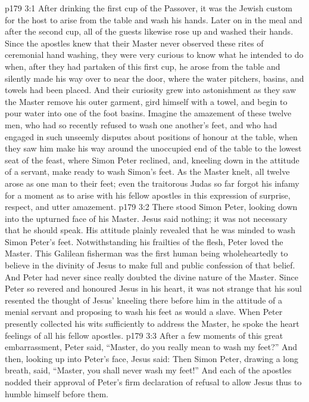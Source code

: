 \vs p179 3:1 After drinking the first cup of the Passover, it was the Jewish custom for the host to arise from the table and wash his hands. Later on in the meal and after the second cup, all of the guests likewise rose up and washed their hands. Since the apostles knew that their Master never observed these rites of ceremonial hand washing, they were very curious to know what he intended to do when, after they had partaken of this first cup, he arose from the table and silently made his way over to near the door, where the water pitchers, basins, and towels had been placed. And their curiosity grew into astonishment as they saw the Master remove his outer garment, gird himself with a towel, and begin to pour water into one of the foot basins. Imagine the amazement of these twelve men, who had so recently refused to wash one another’s feet, and who had engaged in such unseemly disputes about positions of honour at the table, when they saw him make his way around the unoccupied end of the table to the lowest seat of the feast, where Simon Peter reclined, and, kneeling down in the attitude of a servant, make ready to wash Simon’s feet. As the Master knelt, all twelve arose as one man to their feet; even the traitorous Judas so far forgot his infamy for a moment as to arise with his fellow apostles in this expression of surprise, respect, and utter amazement.
\vs p179 3:2 There stood Simon Peter, looking down into the upturned face of his Master. Jesus said nothing; it was not necessary that he should speak. His attitude plainly revealed that he was minded to wash Simon Peter’s feet. Notwithstanding his frailties of the flesh, Peter loved the Master. This Galilean fisherman was the first human being wholeheartedly to believe in the divinity of Jesus  to make full and public confession of that belief. And Peter had never since really doubted the divine nature of the Master. Since Peter so revered and honoured Jesus in his heart, it was not strange that his soul resented the thought of Jesus’ kneeling there before him in the attitude of a menial servant and proposing to wash his feet as would a slave. When Peter presently collected his wits sufficiently to address the Master, he spoke the heart feelings of all his fellow apostles.
\vs p179 3:3 After a few moments of this great embarrassment, Peter said, “Master, do you really mean to wash my feet?” And then, looking up into Peter’s face, Jesus said:  Then Simon Peter, drawing a long breath, said, “Master, you shall never wash my feet!” And each of the apostles nodded their approval of Peter’s firm declaration of refusal to allow Jesus thus to humble himself before them.
